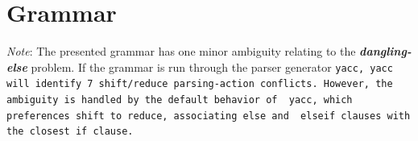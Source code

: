 \documentclass{book}
\begin{document}


\section{Grammar} %
\label{sec:grammar}

\emph{Note}: The presented grammar has one minor ambiguity relating to the
\textbf{\emph{dangling-else}} problem. If the grammar is run through the parser
generator \tt yacc\rm, \tt yacc \rm will identify 7 shift/reduce parsing-action
conflicts. However, the ambiguity is handled by the default behavior of \tt
yacc\rm, which preferences shift to reduce, associating \tt else \rm and \tt
elseif \rm clauses with the closest \tt if \rm clause.
\end{document}
